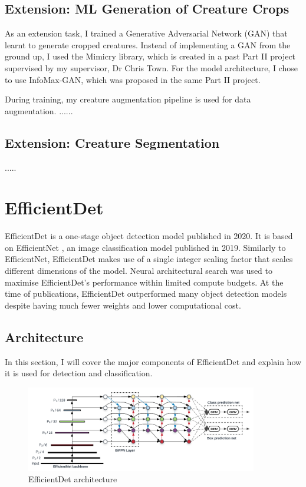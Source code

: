 \documentclass[12pt,a4paper,twoside,openright]{report}
\begin{document}
\subsection{Extension: ML Generation of Creature Crops}
As an extension task, I trained a Generative Adversarial Network (GAN) that learnt to generate cropped creatures. Instead of implementing a GAN from the ground up, I used the Mimicry \cite{lee_mimicry_2020} library, which is created in a past Part II project supervised by my supervisor, Dr Chris Town. For the model architecture, I chose to use InfoMax-GAN, which was proposed in the same Part II project.

During training, my creature augmentation pipeline is used for data augmentation. 
......
\subsection{Extension: Creature Segmentation}

.....


\section{EfficientDet}
EfficientDet \cite{tan_efficientdet_2020} is a one-stage object detection model published in 2020. It is based on EfficientNet \cite{tan_efficientnet_2020-1}, an image classification model published in 2019. Similarly to EfficientNet, EfficientDet makes use of a single integer scaling factor that scales different dimensions of the model. Neural architectural search was used to maximise EfficientDet's performance within limited compute budgets. At the time of publications, EfficientDet outperformed many object detection models despite having much fewer weights and lower computational cost.

\subsection{Architecture}
In this section, I will cover the major components of EfficientDet and explain how it is used for detection and classification.

\begin{figure}[h]
    \centering
    \includegraphics[width=0.9\textwidth]{figs/implementation/efficientdetarch.png}
    \caption{EfficientDet architecture}
    \label{fig:efficientdetarch}
\end{figure}
\end{document}
